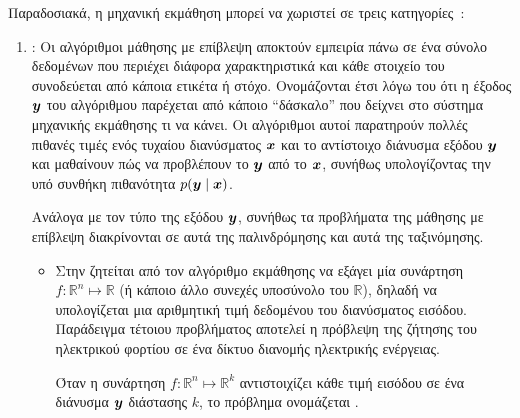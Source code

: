 Παραδοσιακά, η μηχανική εκμάθηση μπορεί να χωριστεί σε τρεις κατηγορίες~\cite{goodfellow}:
\begin{enumerate}
    \item {}:
          Οι αλγόριθμοι μάθησης με επίβλεψη αποκτούν εμπειρία πάνω σε ένα σύνολο δεδομένων που περιέχει διάφορα χαρακτηριστικά και κάθε στοιχείο του συνοδεύεται από κάποια ετικέτα ή στόχο.
          Ονομάζονται έτσι λόγω του ότι η έξοδος $\vy$ του αλγόριθμου παρέχεται από κάποιο \enquote{δάσκαλο} που δείχνει στο σύστημα μηχανικής εκμάθησης τι να κάνει.
          Οι αλγόριθμοι αυτοί παρατηρούν πολλές πιθανές τιμές ενός τυχαίου διανύσματος $\vx$ και το αντίστοιχο διάνυσμα εξόδου $\vy$ και μαθαίνουν πώς να προβλέπουν το $\vy$ από το $\vx$,
          συνήθως υπολογίζοντας την υπό συνθήκη πιθανότητα $p(\vy \mid \vx)$.

          Ανάλογα με τον τύπο της εξόδου $\vy$, συνήθως τα προβλήματα της μάθησης με επίβλεψη διακρίνονται σε αυτά της παλινδρόμησης και αυτά της ταξινόμησης.
          \begin{itemize}
              \item Στην 
                    ζητείται από τον αλγόριθμο εκμάθησης να εξάγει μία συνάρτηση $f : \mathbb{R}^n \mapsto \mathbb{R}$
                    (ή κάποιο άλλο συνεχές υποσύνολο του $\mathbb{R}$),
                    δηλαδή να υπολογίζεται μια αριθμητική τιμή δεδομένου του διανύσματος εισόδου.
                    Παράδειγμα τέτοιου προβλήματος αποτελεί η πρόβλεψη της ζήτησης του ηλεκτρικού φορτίου σε ένα δίκτυο διανομής ηλεκτρικής ενέργειας.

                    Όταν η συνάρτηση $f : \mathbb{R}^n \mapsto \mathbb{R}^k$ αντιστοιχίζει κάθε τιμή εισόδου σε ένα διάνυσμα $\vy$ διάστασης $k$,
                    το πρόβλημα ονομάζεται .


\end{itemize}
\end{enumerate}
